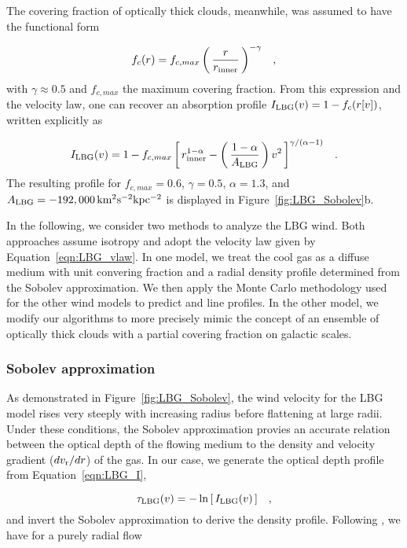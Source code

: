 \documentclass[12pt,preprint]{aastex}
\begin{document}
The covering fraction of optically thick clouds, meanwhile, was assumed to have
the functional form

\begin{equation}
f_c(r) = f_{c,max} \left ( \, \frac{r}{r_{\rm inner}} \, \right )^{-\gamma} \;\;\; ,
\label{eqn:covering}
\end{equation}
with $\gamma \approx 0.5$ and $f_{c,max}$ the maximum covering
fraction.  From this expression and the velocity law, one can recover
an absorption profile $I_{\rm LBG}(v) = 1 - f_c(r[v])$, written
explicitly as

\begin{equation}
I_{\rm LBG}(v) = 1 - f_{c,max} \left [ \, r_{\rm inner}^{1-\alpha} - \left ( \,
\frac{1-\alpha}{A_{\rm LBG}} \, \right ) v^2 \, \right ]^{\gamma/(\alpha-1)}
\;\;\; .
\label{eqn:LBG_I}
\end{equation}
The resulting profile for $f_{c,max} = 0.6$, $\gamma=0.5$,
$\alpha=1.3$, and $A_{\rm LBG} = -192,000 \, \rm km^2 s^{-2} kpc^{-2}$ 
is displayed in Figure~\ref{fig:LBG_Sobolev}b.  

In the following, we consider two methods to analyze the LBG wind.
Both approaches assume isotropy and adopt the velocity law given by
Equation~\ref{eqn:LBG_vlaw}.  In one model, we treat the cool gas as a
diffuse medium with unit convering fraction and a radial density
profile determined from the Sobolev approximation.  We then apply 
the Monte Carlo methodology used for the other wind models to predict
 and  line profiles.  In the other model,
we modify our algorithms to more precisely mimic the concept of an
ensemble of optically thick clouds with a partial covering fraction on
galactic scales.

\subsubsection{Sobolev approximation}
\label{sec:Sobolev}

As demonstrated in Figure~\ref{fig:LBG_Sobolev}, the wind velocity for
the LBG model rises very steeply with increasing radius before
flattening at large radii.  Under these conditions, the Sobolev
approximation provies an accurate relation between the optical depth
of the flowing medium to the
density and velocity gradient ($dv_{\rm r}/dr$) of the gas.  In our case, we 
generate the optical depth profile from Equation~\ref{eqn:LBG_I}, 

\begin{equation}
\tau_{\rm LBG}(v) = -\ln \left [ \, I_{\rm LBG}(v) \, \right ] \;\;\; ,
\label{eqn:tauLBG}
\end{equation}
and invert the Sobolev approximation to derive the density profile.
Following \cite{lc99}, we have for a purely radial flow
\end{document}
